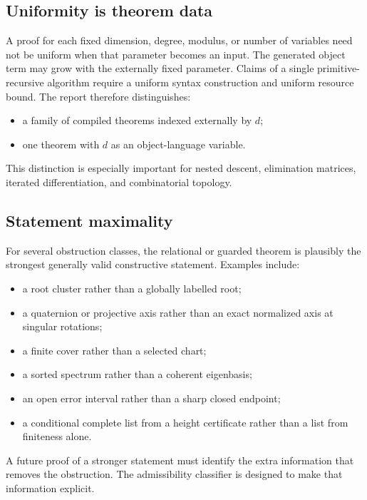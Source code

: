 \subsection{Uniformity is theorem data}

A proof for each fixed dimension, degree, modulus, or number of variables need not be uniform when that parameter becomes an input.  The generated object term may grow with the externally fixed parameter.  Claims of a single primitive-recursive algorithm require a uniform syntax construction and uniform resource bound.  The report therefore distinguishes:

\begin{itemize}
  \item a family of compiled theorems indexed externally by $d$;
  \item one theorem with $d$ as an object-language variable.
\end{itemize}

This distinction is especially important for nested descent, elimination matrices, iterated differentiation, and combinatorial topology.

\subsection{Statement maximality}

For several obstruction classes, the relational or guarded theorem is plausibly the strongest generally valid constructive statement.  Examples include:

\begin{itemize}
  \item a root cluster rather than a globally labelled root;
  \item a quaternion or projective axis rather than an exact normalized axis at singular rotations;
  \item a finite cover rather than a selected chart;
  \item a sorted spectrum rather than a coherent eigenbasis;
  \item an open error interval rather than a sharp closed endpoint;
  \item a conditional complete list from a height certificate rather than a list from finiteness alone.
\end{itemize}

A future proof of a stronger statement must identify the extra information that removes the obstruction.  The admissibility classifier is designed to make that information explicit.


